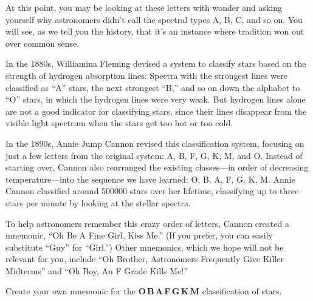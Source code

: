 \documentclass{article}
\numberwithin{equation}{section}
\numberwithin{figure}{section}
\begin{document}
At this point, you may be looking at these letters with wonder and asking yourself why astronomers didn't call the spectral types A, B, C, and so on. You will see, as we tell you the history, that it's an instance where tradition won out over common sense.
\vspace{1em}

In the 1880s, Williamina Fleming devised a system to classify stars based on the strength of hydrogen absorption lines. Spectra with the strongest lines were classified as ``A'' stars, the next strongest ``B,'' and so on down the alphabet to ``O'' stars, in which the hydrogen lines were very weak. But hydrogen lines alone are not a good indicator for classifying stars, since their lines disappear from the visible light spectrum when the stars get too hot or too cold.
\vspace{1em}

In the 1890s, Annie Jump Cannon revised this classification system, focusing on just a few letters from the original system: A, B, F, G, K, M, and O. Instead of starting over, Cannon also rearranged the existing classes---in order of decreasing temperature---into the sequence we have learned: O, B, A, F, G, K, M. Annie Cannon classified around \SI{500000}{} stars over her lifetime, classifying up to three stars per minute by looking at the stellar spectra.
\vspace{1em}

To help astronomers remember this crazy order of letters, Cannon created a mnemonic, ``Oh Be A Fine Girl, Kiss Me.'' (If you prefer, you can easily substitute ``Guy'' for ``Girl.'') Other mnemonics, which we hope will not be relevant for you, include ``Oh Brother, Astronomers Frequently Give Killer Midterms'' and ``Oh Boy, An F Grade Kills Me!''

\begin{exercise}
    Create your own mnemonic for the \textbf{O\,B\,A\,F\,G\,K\,M} classification of stars.
\end{exercise}



\end{document}
